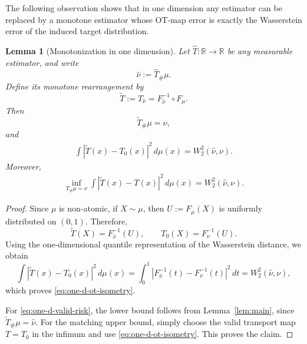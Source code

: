 \documentclass[11pt,twoside]{article}
\newtheorem{lemma}{Lemma}
\begin{document}
The following observation shows that in one dimension any estimator can be replaced by a monotone estimator whose OT-map error is exactly the Wasserstein error of the induced target distribution.

\begin{lemma}[Monotonization in one dimension]
\label{lem:one-d-monotonization}
Let $\widehat{T}:\mathbb{R}\to\mathbb{R}$ be any measurable estimator, and write
\[
\widehat{\nu}:=\widehat{T}_{\#}\mu.
\]
Define its monotone rearrangement by
\[
\widetilde{T}:=T_{\widehat{\nu}}
=
F_{\widehat{\nu}}^{-1}\circ F_\mu.
\]
Then
\[
\widetilde{T}_{\#}\mu=\widehat{\nu},
\]
and
\begin{align}
\label{eq:one-d-ot-isometry}
\int |\widetilde{T}(x)-T_0(x)|^2\,d\mu(x)
=
W_2^2(\widehat{\nu},\nu).
\end{align}
Moreover,
\begin{align}
\label{eq:one-d-valid-risk}
\inf_{T_{\#}\mu=\nu}
\int |\widetilde{T}(x)-T(x)|^2\,d\mu(x)
=
W_2^2(\widehat{\nu},\nu).
\end{align}
\end{lemma}

\begin{proof}
Since $\mu$ is non-atomic, if $X\sim\mu$, then $U:=F_\mu(X)$ is uniformly distributed on $(0,1)$. Therefore,
\[
\widetilde{T}(X)=F_{\widehat{\nu}}^{-1}(U),
\qquad
T_0(X)=F_\nu^{-1}(U).
\]
Using the one-dimensional quantile representation of the Wasserstein distance, we obtain
\[
\int |\widetilde{T}(x)-T_0(x)|^2\,d\mu(x)
=
\int_0^1
|F_{\widehat{\nu}}^{-1}(t)-F_\nu^{-1}(t)|^2\,dt
=
W_2^2(\widehat{\nu},\nu),
\]
which proves \eqref{eq:one-d-ot-isometry}.

For \eqref{eq:one-d-valid-risk}, the lower bound follows from Lemma~\ref{lem:main}, since $\widetilde{T}_{\#}\mu=\widehat{\nu}$. For the matching upper bound, simply choose the valid transport map $T=T_0$ in the infimum and use \eqref{eq:one-d-ot-isometry}. This proves the claim.
\end{proof}
\end{document}
